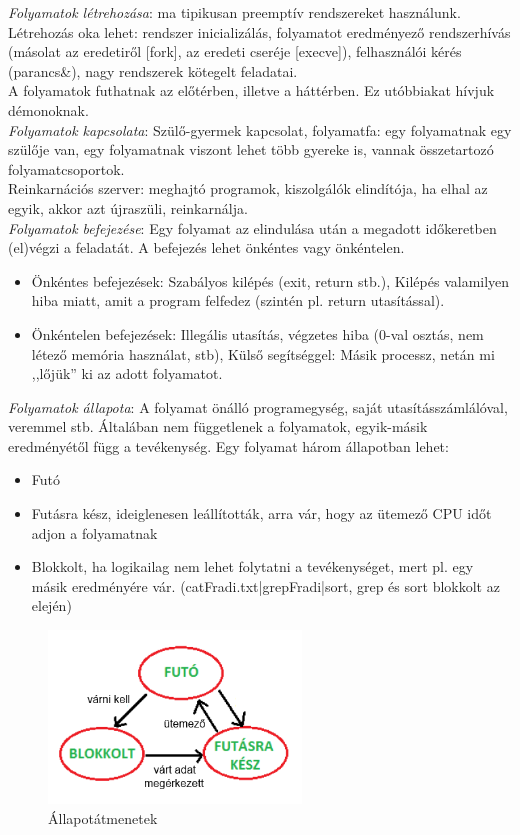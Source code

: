 \documentclass[margin=0px]{article}
\begin{document}
	\textit{Folyamatok létrehozása}: ma tipikusan preemptív rendszereket használunk. Létrehozás oka lehet: rendszer inicializálás, folyamatot eredményező rendszerhívás (másolat az eredetiről [fork], az eredeti cseréje [execve]), felhasználói kérés (parancs\&), nagy rendszerek kötegelt feladatai. \\
	A folyamatok futhatnak az előtérben, illetve a háttérben. Ez utóbbiakat hívjuk démonoknak.\\
	\textit{Folyamatok kapcsolata}: Szülő-gyermek kapcsolat, folyamatfa: egy folyamatnak egy szülője van, egy folyamatnak viszont lehet több gyereke is, vannak összetartozó folyamatcsoportok. \\ Reinkarnációs szerver: meghajtó programok, kiszolgálók elindítója, ha elhal az egyik, akkor azt újraszüli, reinkarnálja. \\
	\textit{Folyamatok befejezése}: Egy folyamat az elindulása után a megadott időkeretben (el)végzi a feladatát. A befejezés lehet önkéntes vagy önkéntelen.
	\begin{itemize}
		\item Önkéntes befejezések: Szabályos kilépés (exit, return stb.), Kilépés valamilyen hiba miatt, amit a program felfedez (szintén pl. return utasítással).
		\item Önkéntelen befejezések: Illegális utasítás, végzetes hiba (0-val osztás, nem létező memória használat, stb), Külső segítséggel: Másik processz, netán mi ,,lőjük” ki az adott folyamatot.
	\end{itemize}
	\textit{Folyamatok állapota}: A folyamat önálló programegység, saját utasításszámlálóval, veremmel stb. Általában nem függetlenek a folyamatok, egyik-másik eredményétől függ a tevékenység. Egy folyamat három állapotban lehet:
	\begin{itemize}
		\item Futó
		\item Futásra kész, ideiglenesen leállították, arra vár, hogy az ütemező CPU időt adjon a folyamatnak
		\item Blokkolt, ha logikailag nem lehet folytatni a tevékenységet, mert pl. egy másik eredményére vár. (catFradi.txt|grepFradi|sort, grep és sort blokkolt az elején)
	\end{itemize}
	\begin{figure}[H]
		\centering
		\includegraphics[width=0.6\textwidth]{img/allapot.png}
		\caption{Állapotátmenetek}
	\end{figure}
	
\end{document}
